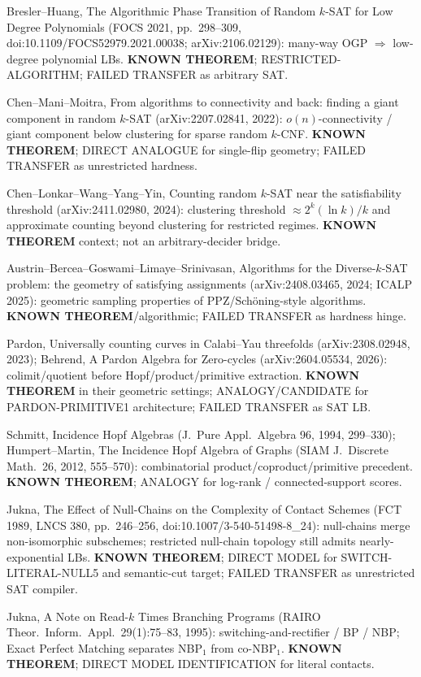 \documentclass[11pt]{article}
\begin{document}
Bresler--Huang, The Algorithmic Phase Transition of Random $k$-SAT for Low Degree
Polynomials (FOCS 2021, pp.\ 298--309, doi:10.1109/FOCS52979.2021.00038;
arXiv:2106.02129): many-way OGP $\Rightarrow$ low-degree polynomial LBs.
\textbf{KNOWN THEOREM}; RESTRICTED-ALGORITHM; FAILED TRANSFER as arbitrary SAT.

Chen--Mani--Moitra, From algorithms to connectivity and back: finding a giant component
in random $k$-SAT (arXiv:2207.02841, 2022): $o(n)$-connectivity / giant component below
clustering for sparse random $k$-CNF. \textbf{KNOWN THEOREM}; DIRECT ANALOGUE for
single-flip geometry; FAILED TRANSFER as unrestricted hardness.

Chen--Lonkar--Wang--Yang--Yin, Counting random $k$-SAT near the satisfiability threshold
(arXiv:2411.02980, 2024): clustering threshold $\approx 2^k(\ln k)/k$ and approximate
counting beyond clustering for restricted regimes.
\textbf{KNOWN THEOREM} context; not an arbitrary-decider bridge.

Austrin--Bercea--Goswami--Limaye--Srinivasan, Algorithms for the Diverse-$k$-SAT problem:
the geometry of satisfying assignments (arXiv:2408.03465, 2024; ICALP 2025):
geometric sampling properties of PPZ/Sch\"oning-style algorithms.
\textbf{KNOWN THEOREM}/algorithmic; FAILED TRANSFER as hardness hinge.

Pardon, Universally counting curves in Calabi--Yau threefolds (arXiv:2308.02948, 2023);
Behrend, A Pardon Algebra for Zero-cycles (arXiv:2604.05534, 2026):
colimit/quotient before Hopf/product/primitive extraction.
\textbf{KNOWN THEOREM} in their geometric settings; ANALOGY/CANDIDATE for
PARDON-PRIMITIVE1 architecture; FAILED TRANSFER as SAT LB.

Schmitt, Incidence Hopf Algebras (J.\ Pure Appl.\ Algebra 96, 1994, 299--330);
Humpert--Martin, The Incidence Hopf Algebra of Graphs (SIAM J.\ Discrete Math.\ 26,
2012, 555--570): combinatorial product/coproduct/primitive precedent.
\textbf{KNOWN THEOREM}; ANALOGY for log-rank / connected-support scores.

Jukna, The Effect of Null-Chains on the Complexity of Contact Schemes
(FCT 1989, LNCS 380, pp.\ 246--256, doi:10.1007/3-540-51498-8\_24):
null-chains merge non-isomorphic subschemes; restricted null-chain topology still admits
nearly-exponential LBs. \textbf{KNOWN THEOREM}; DIRECT MODEL for SWITCH-LITERAL-NULL5
and semantic-cut target; FAILED TRANSFER as unrestricted SAT compiler.

Jukna, A Note on Read-$k$ Times Branching Programs
(RAIRO Theor.\ Inform.\ Appl.\ 29(1):75--83, 1995):
switching-and-rectifier / BP / NBP; Exact Perfect Matching separates NBP$_1$ from co-NBP$_1$.
\textbf{KNOWN THEOREM}; DIRECT MODEL IDENTIFICATION for literal contacts.
\end{document}
